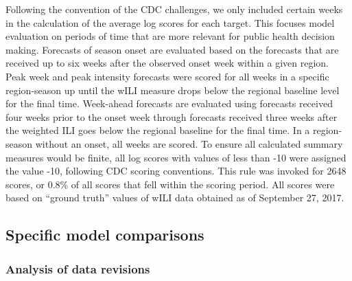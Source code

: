 \documentclass[9pt,twocolumn,twoside]{pnas-new}\usepackage[]{graphicx}\usepackage[]{color}
\begin{document}
{Following the convention of the CDC challenges, we only included certain weeks in the calculation of the average log scores for each target.
This focuses model evaluation on periods of time that are more relevant for public health decision making.
Forecasts of season onset are evaluated based on the forecasts that are received up to six weeks after the observed onset week within a given region.
Peak week and peak intensity forecasts were scored for all weeks in a specific region-season up until the wILI measure drops below the regional baseline level for the final time. 
Week-ahead forecasts are evaluated using forecasts received four weeks prior to the onset week through forecasts received three weeks after the weighted ILI goes below the regional baseline for the final time.
In a region-season without an onset, all weeks are scored.
To ensure all calculated summary measures would be finite, all log scores with values of less than -10 were assigned the value -10, following CDC scoring conventions.
This rule was invoked for 2648 scores, or 0.8\% of all scores that fell within the scoring period.
All scores were based on ``ground truth'' values of wILI data obtained as of September 27, 2017.

% 


\subsection*{Specific model comparisons}\label{sec:delay-model}

\subsubsection*{Analysis of data revisions}

}
\end{document}
